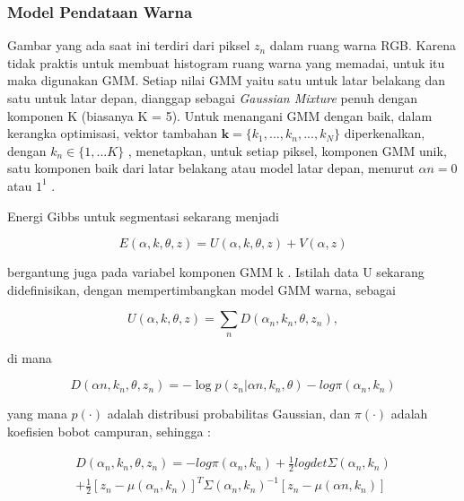 \subsubsection{{Model Pendataan Warna}}

Gambar yang ada saat ini terdiri dari piksel \(z_{n}\) dalam ruang warna RGB. 
Karena tidak praktis untuk membuat histogram ruang warna yang memadai, untuk itu 
maka digunakan GMM. Setiap nilai GMM yaitu satu untuk latar belakang dan satu untuk 
latar depan, dianggap sebagai \emph{Gaussian Mixture} penuh dengan komponen K 
(biasanya K = 5). Untuk menangani GMM dengan baik, dalam kerangka optimisasi, vektor 
tambahan \(\textbf{k} = \{k_{1},...,k_{n},...,k_{N}\}\) diperkenalkan, dengan 
\(k_{n} \in \{1,...K\}\) , menetapkan, untuk setiap piksel, komponen GMM unik, satu 
komponen baik dari latar belakang atau model latar depan, menurut \( \alpha n = 0\) 
atau \(1^1\) .


Energi Gibbs untuk segmentasi sekarang menjadi 

\begin{equation} \label{eq:rumus_energi0}
  E(\alpha,k,\theta, z) = U(\alpha,k,\theta, z) + V(\alpha, z)
\end{equation} 

bergantung juga pada variabel komponen GMM k . Istilah data U sekarang didefinisikan, 
dengan mempertimbangkan model GMM warna, sebagai 

\begin{equation} \label{eq:rumus_energi1}
  U(\alpha,k,\theta, z) =  \sum_{n} D(\alpha_{n}, k_{n},\theta,z_{n}),
\end{equation}  

di mana 

\begin{equation} \label{eq:rumus_D}
  D(\alpha n, k_{n} ,\theta,z_{n}) = - \log p(z_{n} | \alpha n, k_{n},\theta) - log \pi(\alpha_n, k_{n})
\end{equation}

yang mana \(p(\cdot)\)  adalah distribusi probabilitas Gaussian, dan \(\pi(\cdot)\) adalah 
koefisien bobot campuran, sehingga : 

\begin{multline} \label{eq:rumus_energi2}
      D(\alpha_{n}, k_{n},\theta,z_{n}) = - log \pi(\alpha_{n}, k_{n}) + \frac{1}{2} logdet \Sigma(\alpha_{n}, k_{n}) \\
      + \frac{1}{2} [z_{n} - \mu (\alpha_{n}, k_{n})]^T \Sigma(\alpha_{n}, k_{n})^{-1} [z_{n} -  \mu (\alpha n, k_{n})]    
\end{multline}

